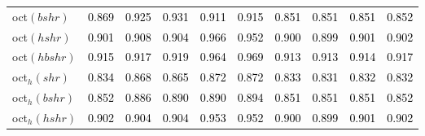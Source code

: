 \begin{tabular}[t]{l|ccccccccc}
oct$(bshr)$ & \textcolor{black}{0.869} & \textcolor{black}{0.925} & \textcolor{black}{0.931} & \textcolor{black}{0.911} & \textcolor{black}{0.915} & \textcolor{black}{0.851} & \textcolor{black}{0.851} & \textcolor{black}{0.851} & \textcolor{black}{0.852}\\
oct$(hshr)$ & \textcolor{black}{0.901} & \textcolor{black}{0.908} & \textcolor{black}{0.904} & \textcolor{black}{0.966} & \textcolor{black}{0.952} & \textcolor{black}{0.900} & \textcolor{black}{0.899} & \textcolor{black}{0.901} & \textcolor{black}{0.902}\\
oct$(hbshr)$ & \textcolor{black}{0.915} & \textcolor{black}{0.917} & \textcolor{black}{0.919} & \textcolor{black}{0.964} & \textcolor{black}{0.969} & \textcolor{black}{0.913} & \textcolor{black}{0.913} & \textcolor{black}{0.914} & \textcolor{black}{0.917}\\
oct$_h(shr)$ & \textcolor{black}{0.834} & \textcolor{black}{0.868} & \textcolor{black}{0.865} & \textcolor{black}{0.872} & \textcolor{black}{0.872} & \textcolor{black}{0.833} & \textcolor{black}{0.831} & \textcolor{black}{0.832} & \textcolor{black}{0.832}\\
oct$_h(bshr)$ & \textcolor{black}{0.852} & \textcolor{black}{0.886} & \textcolor{black}{0.890} & \textcolor{black}{0.890} & \textcolor{black}{0.894} & \textcolor{black}{0.851} & \textcolor{black}{0.851} & \textcolor{black}{0.851} & \textcolor{black}{0.852}\\
oct$_h(hshr)$ & \textcolor{black}{0.902} & \textcolor{black}{0.904} & \textcolor{black}{0.904} & \textcolor{black}{0.953} & \textcolor{black}{0.952} & \textcolor{black}{0.900} & \textcolor{black}{0.899} & \textcolor{black}{0.901} & \textcolor{black}{0.902}\\
\bottomrule
\end{tabular}
